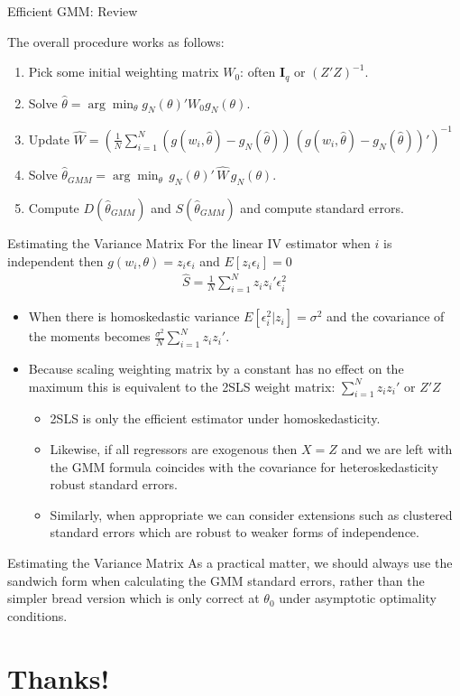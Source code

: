 \documentclass[aspectratio=169]{beamer}
\begin{document}
\begin{frame}{Efficient GMM: Review}

\noindent The overall procedure works as follows:
\begin{enumerate}
\item Pick some initial weighting matrix $W_0$: often $\mathbf{I}_q$ or $(Z'Z)^{-1}$.
\item Solve $\hat{\theta} = \arg \min_{\theta} g_N(\theta)' W_0  g_N(\theta)$.
\item Update $\hat{W} = \left(\frac{1}{N} \sum_{i=1}^N (g(w_i,\hat{\theta}) - g_N(\hat{\theta}))  \, (g(w_i,\hat{\theta}) - g_N(\hat{\theta}))'\right)^{-1}$
\item Solve $\hat{\theta}_{GMM} = \arg \min_{\theta}\, g_N(\theta)' \, \hat{W} \, g_N(\theta)$.
\item Compute $D(\hat{\theta}_{GMM})$ and $S(\hat{\theta}_{GMM})$ and compute standard errors.
\end{enumerate}
\end{frame}

\begin{frame}{Estimating the Variance Matrix}
For the linear IV estimator when $i$ is independent then $g(w_i,\theta) = z_i \epsilon_i$ and $E[z_i \epsilon_i]=0$
\begin{eqnarray*}
\hat{S}=\frac{1}{N} \sum_{i=1}^N z_i z_i' \epsilon_i^2
\end{eqnarray*}
\begin{itemize}
\item When there is homoskedastic variance $E[\epsilon_i^2 | z_i] = \sigma^2$ and the covariance of the moments becomes $\frac{\sigma^2}{N} \sum_{i=1}^N z_i z_i'$.
\item Because scaling weighting matrix by a constant has no effect on the maximum this is equivalent to the 2SLS weight matrix: $\sum_{i=1}^N z_i z_i'$ or $Z'Z$
\begin{itemize}
\item  2SLS is only the efficient estimator under \alert{homoskedasticity}.
\item  Likewise, if all regressors are exogenous then $X=Z$ and we are left with the GMM formula coincides with the covariance for heteroskedasticity robust standard errors.
\item Similarly, when appropriate we can consider extensions such as \alert{clustered standard errors} which are robust to weaker forms of independence.
\end{itemize}
\end{itemize}
\end{frame}

\begin{frame}{Estimating the Variance Matrix}
 As a practical matter, we should always use the \alert{sandwich} form when calculating the GMM standard errors, rather than the simpler \alert{bread} version which is only correct at $\theta_0$ under asymptotic optimality conditions.
\end{frame}
\section*{Thanks!}
\end{document}
